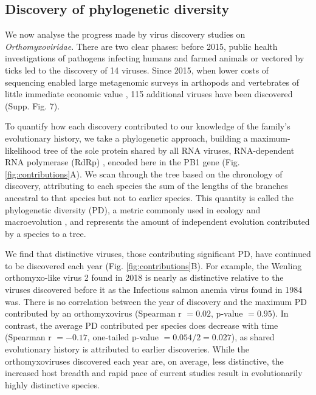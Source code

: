 \documentclass[11pt,twocolumn]{article}
\begin{document}
\begin{figure}
\end{figure}


\subsection{Discovery of phylogenetic diversity}

We now analyse the progress made by virus discovery studies on \textit{Orthomyxoviridae}. There are two clear phases: before 2015, public health investigations of pathogens infecting humans and farmed animals or vectored by ticks led to the discovery of 14 viruses. Since 2015, when lower costs of sequencing enabled large metagenomic surveys in arthopods and vertebrates of little immediate economic value \citep{li_unprecedented_2015, shi_evolutionary_2018}, 115 additional viruses have been discovered (Supp. Fig. 7).


To quantify how each discovery contributed to our knowledge of the family's evolutionary history, we take a phylogenetic approach, building a maximum-likelihood tree of the sole protein shared by all RNA viruses, RNA-dependent RNA polymerase (RdRp) \citep{koonin_virus_2014}, encoded here in the PB1 gene \citep{kobayashi_influenza_1996} (Fig. \ref{fig:contributions}A). We scan through the tree based on the chronology of discovery, attributing to each species the sum of the lengths of the branches ancestral to that species but not to earlier species. This quantity is called the phylogenetic diversity (PD), a metric commonly used in ecology and macroevolution \citep{lum_tracking_2022}, and represents the amount of independent evolution \citep{felsenstein_phylogenies_1985} contributed by a species to a tree.


We find that distinctive viruses, those contributing significant PD, have continued to be discovered each year (Fig. \ref{fig:contributions}B). For example, the Wenling orthomyxo-like virus 2 found in 2018 is nearly as distinctive relative to the viruses discovered before it as the Infectious salmon anemia virus found in 1984 was. There is no correlation between the year of discovery and the maximum PD contributed by an orthomyxovirus (Spearman r $ = 0.02$, p-value $ = 0.95$). In contrast, the average PD contributed per species does decrease with time (Spearman r $ = -0.17$, one-tailed p-value $ = 0.054/2=0.027$), as shared evolutionary history is attributed to earlier discoveries. While the orthomyxoviruses discovered each year are, on average, less distinctive, the increased host breadth and rapid pace of current studies result in evolutionarily highly distinctive species.
\end{document}
